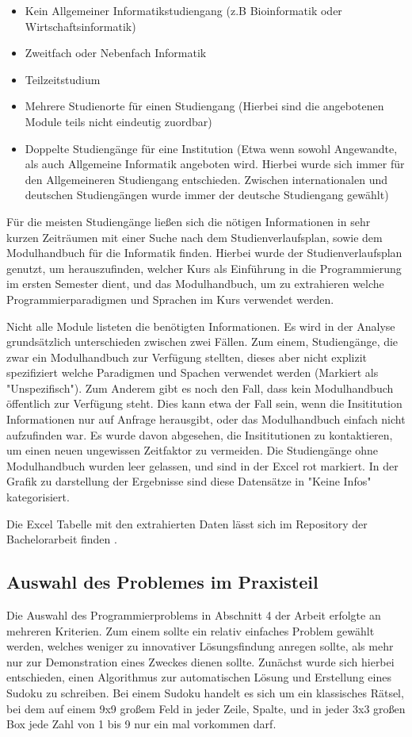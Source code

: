 \begin{itemize}
    \item Kein Allgemeiner Informatikstudiengang (z.B Bioinformatik oder Wirtschaftsinformatik)
    \item Zweitfach oder Nebenfach Informatik
    \item Teilzeitstudium
    \item Mehrere Studienorte für einen Studiengang (Hierbei sind die angebotenen Module teils nicht eindeutig zuordbar)
    \item Doppelte Studiengänge für eine Institution (Etwa wenn sowohl Angewandte, als auch Allgemeine Informatik angeboten wird. Hierbei wurde sich immer für den Allgemeineren Studiengang entschieden. Zwischen internationalen und deutschen Studiengängen wurde immer der deutsche Studiengang gewählt)
\end{itemize}

Für die meisten Studiengänge ließen sich die nötigen Informationen in sehr kurzen Zeiträumen mit einer Suche nach dem Studienverlaufsplan, sowie dem Modulhandbuch für die Informatik finden.
Hierbei wurde der Studienverlaufsplan genutzt, um herauszufinden, welcher Kurs als Einführung in die Programmierung im ersten Semester dient, und das Modulhandbuch, um zu extrahieren welche Programmierparadigmen und Sprachen im Kurs verwendet werden.

Nicht alle Module listeten die benötigten Informationen. Es wird in der Analyse grundsätzlich unterschieden zwischen zwei Fällen. Zum einem, Studiengänge, die zwar ein Modulhandbuch zur Verfügung stellten, dieses aber nicht explizit spezifiziert welche Paradigmen und Spachen verwendet werden (Markiert als "Unspezifisch"). Zum Anderem gibt es noch den Fall, dass kein Modulhandbuch öffentlich zur Verfügung steht. Dies kann etwa der Fall sein, wenn die Insititution Informationen nur auf Anfrage herausgibt, oder das Modulhandbuch einfach nicht aufzufinden war. Es wurde davon abgesehen, die Insititutionen zu kontaktieren, um einen neuen ungewissen Zeitfaktor zu vermeiden. Die Studiengänge ohne Modulhandbuch wurden leer gelassen, und sind in der Excel rot markiert. In der Grafik zu darstellung der Ergebnisse sind diese Datensätze in "Keine Infos" kategorisiert.

Die Excel Tabelle mit den extrahierten Daten lässt sich im Repository der Bachelorarbeit finden \cite{repoxlsx}.

\subsection{Auswahl des Problemes im Praxisteil}
Die Auswahl des Programmierproblems in Abschnitt 4 der Arbeit erfolgte an mehreren Kriterien. Zum einem sollte ein relativ einfaches Problem gewählt werden, welches weniger zu innovativer Lösungsfindung anregen sollte, als mehr nur zur Demonstration eines Zweckes dienen sollte.
Zunächst wurde sich hierbei entschieden, einen Algorithmus zur automatischen Lösung und Erstellung eines Sudoku zu schreiben.
Bei einem Sudoku handelt es sich um ein klassisches Rätsel, bei dem auf einem 9x9 großem Feld in jeder Zeile, Spalte, und in jeder 3x3 großen Box jede Zahl von 1 bis 9 nur ein mal vorkommen darf.

